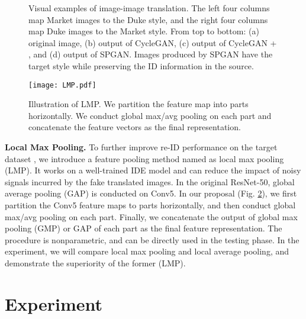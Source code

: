 \documentclass[10pt,twocolumn,letterpaper]{article}
\begin{document}
{\captionsetup[subfigure]{labelformat=empty}
\begin{figure}[t]
\setlength{\abovecaptionskip}{-0.2cm} 
\setlength{\belowcaptionskip}{0cm}
	\centering
	\caption{Visual examples of image-image translation. The left four columns map Market images to the Duke style, and the right four columns map Duke images to the Market style. From top to bottom: (a) original image, (b) output of CycleGAN, (c) output of CycleGAN + , and (d) output of SPGAN. Images produced by SPGAN have the target style while preserving the ID information in the source.}
\label{fig3}
\end{figure}
\begin{figure}[t]
\setlength{\abovecaptionskip}{-0.1cm} 
\setlength{\belowcaptionskip}{-0.2cm}
\begin{center}
\texttt{[image: LMP.pdf]}
\end{center}
\caption{Illustration of LMP. We partition the feature map into   parts horizontally. We conduct global max/avg pooling on each part and concatenate the feature vectors as the final representation.}
\label{fig:LMP}
\end{figure}
\textbf{Local Max Pooling.} To further improve re-ID performance on the target dataset , we introduce a feature pooling method named as local max pooling (LMP). It works on a well-trained IDE model and can reduce the impact of noisy signals incurred by the fake translated images. 
In the original ResNet-50, global average pooling (GAP) is conducted on Conv5. In our proposal (Fig. \ref{fig:LMP}), 
we first partition the Conv5 feature maps to  parts horizontally, and then conduct global max/avg pooling on each part. Finally, we concatenate the output of global max pooling (GMP) or GAP of each part as the final feature representation. The procedure is nonparametric, and can be directly used in the testing phase. In the experiment, we will compare local max pooling and local average pooling, and demonstrate the superiority of the former (LMP).


\section{Experiment} \label{experiments}
}
\end{document}
